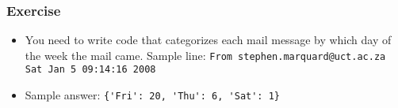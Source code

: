 \begin{frame}[fragile]\frametitle{Exercise}
\begin{itemize}
\item You need to write code that categorizes each mail message by which day of
the week the mail came. Sample line: \lstinline|From stephen.marquard@uct.ac.za Sat Jan 5 09:14:16 2008|
\item Sample answer: \lstinline|{'Fri': 20, 'Thu': 6, 'Sat': 1}|
\end{itemize}
\end{frame}


%
%
%
%  
%
%



